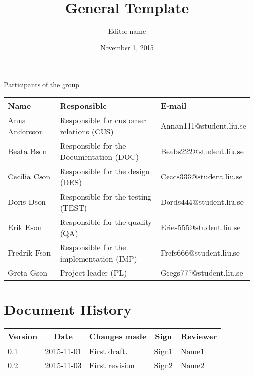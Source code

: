 \documentclass[10pt,oneside,english]{lips}
\title{General Template}
\author{Editor name}
\date{November 1, 2015}
\begin{document}
\maketitle

\cleardoublepage
\makeprojectid

\begin{center}
  \Large Participants of the group
\end{center}
\begin{center}
  \begin{tabular}{|l|l|l|}
    \hline
    \textbf{Name} & \textbf{Responsible} & \textbf{E-mail}\\
    \hline
    Anna Andersson & Responsible for customer relations (CUS) & Annan111@student.liu.se\\
    \hline
    Beata Bson & Responsible for the Documentation (DOC) & Beabs222@student.liu.se\\
    \hline
    Cecilia Cson & Responsible for the design (DES) & Ceccs333@student.liu.se\\
    \hline
    Doris Dson & Responsible for the testing (TEST) & Dords444@student.liu.se\\
    \hline
    Erik Eson & Responsible for the quality (QA) & Eries555@student.liu.se\\
    \hline
    Fredrik Fson & Responsible for the implementation (IMP) & Frefs666@student.liu.se\\
    \hline
    Greta Gson & Project leader (PL) & Gregs777@student.liu.se\\
    \hline
  \end{tabular}
\end{center}


\cleardoublepage
\tableofcontents

\cleardoublepage
\section*{Document History}
\begin{tabular}{p{}|p{}|p{}|p{}|p{}} 
  \multicolumn{1}{c}{\bfseries Version} & 
  \multicolumn{1}{|c}{\bfseries Date} & 
  \multicolumn{1}{|c}{\bfseries Changes made} & 
  \multicolumn{1}{|c}{\bfseries Sign} & 
  \multicolumn{1}{|c}{\bfseries Reviewer}\\
  \hline
  \hline
  0.1 & 2015-11-01 & First draft. & Sign1 & Name1   \\
  \hline
  0.2 & 2015-11-03 & First revision & Sign2 & Name2   \\
  \hline
\end{tabular}
\end{document}
